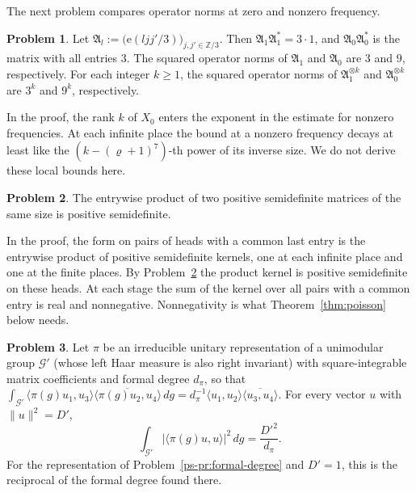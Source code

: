 \documentclass[reqno]{amsart}
\theoremstyle{definition}
\newtheorem{problem}{Problem}[section]
\theoremstyle{plain}
\theoremstyle{remark}
\newcommand{\Z}{\mathbb{Z}}
\begin{document}
The next problem compares operator norms at zero and nonzero frequency.

\begin{problem}\label{pr:three}
Let \(\mathfrak A_l:=\bigl(\mathrm e(ljj'/3)\bigr)_{j,j'\in\Z/3}\).  Then \(\mathfrak A_1\mathfrak A_1^*=3\cdot1\), and \(\mathfrak A_0\mathfrak A_0^*\) is the matrix with all entries \(3\).  The squared operator norms of \(\mathfrak A_1\) and \(\mathfrak A_0\) are \(3\) and \(9\), respectively.  For each integer \(k\ge1\), the squared operator norms of \(\mathfrak A_1^{\otimes k}\) and \(\mathfrak A_0^{\otimes k}\) are \(3^k\) and \(9^k\), respectively.
\end{problem}

In the proof, the rank \(k\) of \(X_0\) enters the exponent in the estimate for nonzero frequencies.  At each infinite place the bound at a nonzero frequency decays at least like the \((k-(\varrho+1)^7)\)-th power of its inverse size.  We do not derive these local bounds here.

\begin{problem}\label{pr:schur}
The entrywise product of two positive semidefinite matrices of the same size is positive semidefinite.
\end{problem}

In the proof, the form on pairs of heads with a common last entry is the entrywise product of positive semidefinite kernels, one at each infinite place and one at the finite places.  By Problem~\ref{pr:schur} the product kernel is positive semidefinite on these heads.  At each stage the sum of the kernel over all pairs with a common entry is real and nonnegative.  Nonnegativity is what Theorem~\ref{thm:poisson} below needs.

\begin{problem}\label{pr:formal-degree-sum}
Let \(\pi\) be an irreducible unitary representation of a unimodular group \(\mathcal G'\) (whose left Haar measure is also right invariant) with square-integrable matrix coefficients and formal degree \(d_\pi\), so that \(\int_{\mathcal G'}\langle\pi(g)u_1,u_3\rangle\overline{\langle\pi(g)u_2,u_4\rangle}\,dg=d_\pi^{-1}\langle u_1,u_2\rangle\overline{\langle u_3,u_4\rangle}\).  For every vector \(u\) with \(\lVert u\rVert^2=D'\),
\[
 \int_{\mathcal G'}\lvert\langle\pi(g)u,u\rangle\rvert^2\,dg=\frac{D'^2}{d_\pi} .
\]
For the representation of Problem~\ref{ps-pr:formal-degree} and \(D'=1\), this is the reciprocal of the formal degree found there.
\end{problem}
\end{document}
